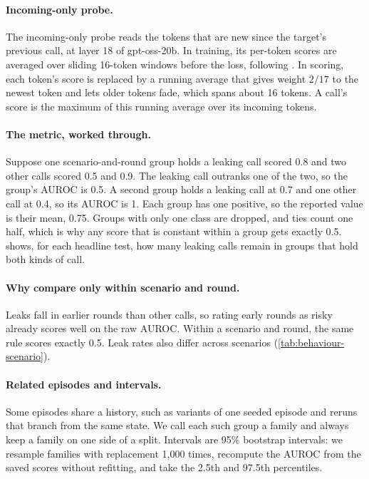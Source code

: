 \paragraph{Incoming-only probe.}
The incoming-only probe reads the tokens that are new since the target's previous call, at layer 18 of gpt-oss-20b.
In training, its per-token scores are averaged over sliding 16-token windows before the loss, following \citet{cunningham2026}.
In scoring, each token's score is replaced by a running average that gives weight $2/17$ to the newest token and lets older tokens fade, which spans about 16 tokens.
A call's score is the maximum of this running average over its incoming tokens.

\paragraph{The metric, worked through.}
Suppose one scenario-and-round group holds a leaking call scored 0.8 and two other calls scored 0.5 and 0.9.
The leaking call outranks one of the two, so the group's AUROC is 0.5.
A second group holds a leaking call at 0.7 and one other call at 0.4, so its AUROC is 1.
Each group has one positive, so the reported value is their mean, 0.75.
Groups with only one class are dropped, and ties count one half, which is why any score that is constant within a group gets exactly 0.5.
 shows, for each headline test, how many leaking calls remain in groups that hold both kinds of call.

\begin{table}[h]
  \centering
  \small
  \setlength{\tabcolsep}{3pt}
  
  \caption{Scenario-and-round groups kept by the metric, and the leaking calls they contain, for each headline test.}
  \label{tab:group-coverage}
\end{table}

\paragraph{Why compare only within scenario and round.}
Leaks fall in earlier rounds than other calls, so rating early rounds as risky already scores well on the raw AUROC.
Within a scenario and round, the same rule scores exactly 0.5.
Leak rates also differ across scenarios (\cref{tab:behaviour-scenario}).

\paragraph{Related episodes and intervals.}
Some episodes share a history, such as variants of one seeded episode and reruns that branch from the same state.
We call each such group a family and always keep a family on one side of a split.
Intervals are 95\% bootstrap intervals: we resample families with replacement 1,000 times, recompute the AUROC from the saved scores without refitting, and take the 2.5th and 97.5th percentiles.

